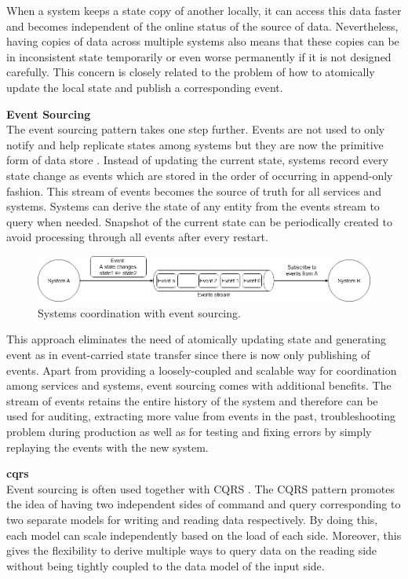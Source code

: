 When a system keeps a state copy of another locally, it can access this data faster and becomes independent of the online status of the source of data. Nevertheless, having copies of data across multiple systems also means that these copies can be in inconsistent state temporarily or even worse permanently if it is not designed carefully. This concern is closely related to the problem of how to atomically update the local state and publish a corresponding event.

\textbf{Event Sourcing}\\
The event sourcing pattern takes one step further. Events are not used to only notify and help replicate states among systems but they are now the primitive form of data store \cite{eventsourcingfowler}. Instead of updating the current state, systems record every state change as events which are stored in the order of occurring in append-only fashion. This stream of events becomes the source of truth for all services and systems. Systems can derive the state of any entity from the events stream to query when needed. Snapshot of the current state can be periodically created to avoid processing through all events after every restart.

\begin{figure}[h]
	\includegraphics[width=\linewidth]{images/eventsourcing.png}
	\caption{Systems coordination with event sourcing.}
	\label{fig:eventsourcing}
\end{figure}

This approach eliminates the need of atomically updating state and generating event as in event-carried state transfer since there is now only publishing of events. Apart from providing a loosely-coupled and scalable way for coordination among services and systems, event sourcing comes with additional benefits. The stream of events retains the entire history of the system and therefore can be used for auditing, extracting more value from events in the past, troubleshooting problem during production as well as for testing and fixing errors by simply replaying the events with the new system.

\textbf{\acrfull{cqrs}}\\
Event sourcing is often used together with CQRS \cite{cqrsgregyoung}. The CQRS pattern promotes the idea of having two independent sides of command and query corresponding to two separate models for writing and reading data respectively. By doing this, each model can scale independently based on the load of each side. Moreover, this gives the flexibility to derive multiple ways to query data on the reading side without being tightly coupled to the data model of the input side. 


